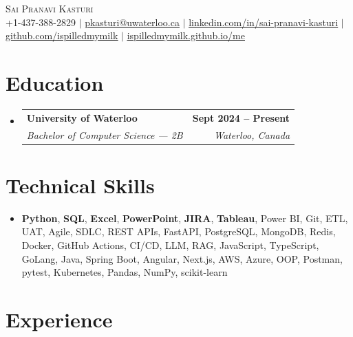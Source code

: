 \documentclass[letterpaper,10pt]{article}
\makeatletter
\newcommand{\resumeSubheading}[4]{
  \vspace{-1pt}\item
    \begin{tabular*}{1.0\textwidth}[t]{l@{\extracolsep{\fill}}r}
      \textbf{#1} & \textbf{\small #2} \\
      \textit{\small#3} & \textit{\small #4} \\[-2pt]
    \end{tabular*}\vspace{-7pt}
}
\newcommand{\resumeSubHeadingListStart}{\begin{itemize}[leftmargin=0.0in, label={}]}
\newcommand{\resumeSubHeadingListEnd}{\end{itemize}}
\makeatother
\begin{document}

\vspace{-28pt}
\begin{center}
    {\Huge \scshape Sai Pranavi Kasturi} \\
    \small +1-437-388-2829 $|$ \underline{pkasturi@uwaterloo.ca} $|$
    \href{https://linkedin.com/in/sai-pranavi-kasturi-704807298}{\underline{linkedin.com/in/sai-pranavi-kasturi}} $|$
    \href{https://github.com/ispilledmymilk}{\underline{github.com/ispilledmymilk}} $|$
    \href{https://ispilledmymilk.github.io/me/}{\underline{ispilledmymilk.github.io/me}}
    \vspace{-10pt}
\end{center}

\vspace{-10pt}
\section{Education}
  \resumeSubHeadingListStart
    \resumeSubheading
      {University of Waterloo}{Sept 2024 -- Present}
      {Bachelor of Computer Science --- 2B}{Waterloo, Canada}
  \resumeSubHeadingListEnd
\vspace{-8pt}

\section{Technical Skills}
\begin{itemize}[leftmargin=0.05in, label={}]
  \small\item{
    \textbf{Python}, \textbf{SQL}, \textbf{Excel}, \textbf{PowerPoint}, \textbf{JIRA}, \textbf{Tableau}, Power BI, Git, ETL, UAT, Agile, SDLC, REST APIs, FastAPI, PostgreSQL, MongoDB, Redis, Docker, GitHub Actions, CI/CD, LLM, RAG, JavaScript, TypeScript, GoLang, Java, Spring Boot, Angular, Next.js, AWS, Azure, OOP, Postman, pytest, Kubernetes, Pandas, NumPy, scikit-learn
  }
\end{itemize}
\vspace{-18pt}

\vspace{1.20pt}
\section{Experience}
\end{document}
